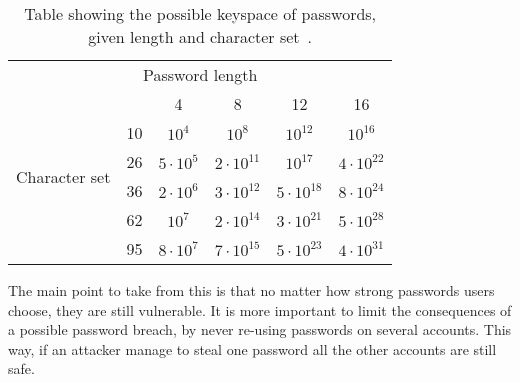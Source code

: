 \begin{table}
    \centering
    \begin{tabular}{c|c|c|c|c|c|}
    \multicolumn{6}{c}{Password length}\\\cline{2-6}
    \multirow{6}{*}{\begin{sideways}Character set\end{sideways}}
      &\cellcolor{Gray}&\cellcolor{Gray}4&\cellcolor{Gray}8&\cellcolor{Gray}12&\cellcolor{Gray}16\\\cline{2-6}
    &\cellcolor{Gray}10&$10^4$&$10^8$&$10^{12}$&$10^{16}$\\\cline{2-6}
    &\cellcolor{Gray}26&$5\cdot10^5$&$2\cdot10^{11}$&$10^{17}$&$4\cdot10^{22}$\\\cline{2-6}
    &\cellcolor{Gray}36&$2\cdot 10^6$&$3\cdot10^{12}$&$5\cdot10^{18}$&$8\cdot10^{24}$\\\cline{2-6}
    &\cellcolor{Gray}62&$10^7$&$2\cdot10^{14}$&$3\cdot10^{21}$&$5\cdot10^{28}$\\\cline{2-6}
    &\cellcolor{Gray}95&$8\cdot10^7$&$7\cdot10^{15}$&$5\cdot10^{23}$&$4\cdot10^{31}$\\\cline{2-6}
    \end{tabular}
    \caption{Table showing the possible keyspace of passwords, given length and character set~\cite{nist-guide}.}
    \label{pw-strength}

\end{table}


\par The main point to take from this is that no matter how strong passwords users choose, they are still vulnerable. It is more important to limit the consequences of a possible password breach, by never re-using passwords on several accounts. This way, if an attacker manage to steal one password all the other accounts are still safe. 

